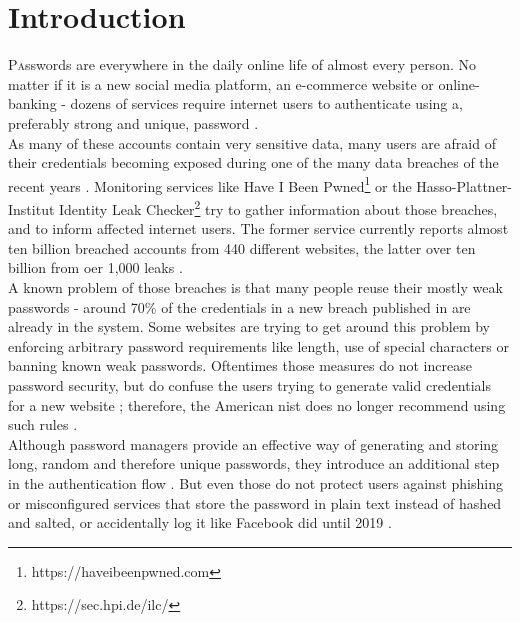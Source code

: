 
\section{Introduction}
\label{sec:intro}

\lettrine[nindent=0em,lines=3]{P}asswords are everywhere in the daily online life of almost every person. No matter if it is a new social media platform, an e-commerce website or online-banking - dozens of services require internet users to authenticate using a, preferably strong and unique, password \cite{nist}.\\
As many of these accounts contain very sensitive data, many users are afraid of their credentials becoming exposed during one of the many data breaches of the recent years \cite{statista_dossier2018}. Monitoring services like Have I Been Pwned\footnote{https://haveibeenpwned.com} or the Hasso-Plattner-Institut Identity Leak Checker\footnote{https://sec.hpi.de/ilc/} try to gather information about those breaches, and to inform affected internet users. The former service currently reports almost ten billion breached accounts from 440 different websites, the latter over ten billion from oer 1,000 leaks \cite{hibp,hpi}.\\
A known problem of those breaches is that many people reuse their mostly weak passwords \cite{bailey2014} - around 70\% of the credentials in a new breach published in\cite{hibp} are already in the system. Some websites are trying to get around this problem by enforcing arbitrary password requirements like length, use of special characters or banning known weak passwords. Oftentimes those measures do not increase password security, but do confuse the users trying to generate valid credentials for a new website \cite{hunt2017}; therefore, the American \ac{nist} does no longer recommend using such rules \cite{nist}.\\
Although password managers provide an effective way of generating and storing long, random and therefore unique passwords, they introduce an additional step in the authentication flow \cite{lyastani2018}.
But even those do not protect users against phishing or misconfigured services that store the password in plain text instead of hashed and salted, or accidentally log it like Facebook did until 2019 \cite{gallagher2019}.\\
